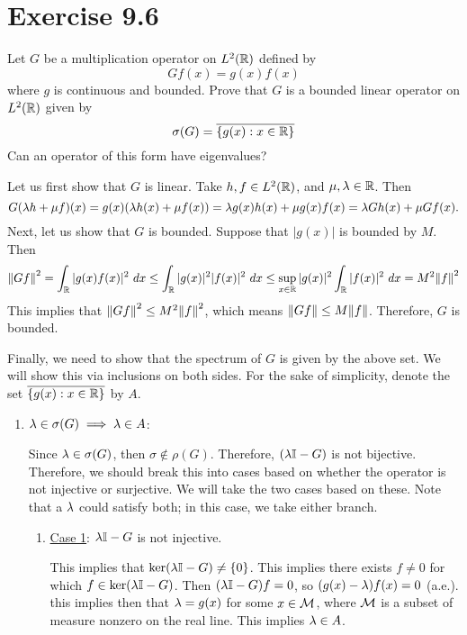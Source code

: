 \section{Exercise 9.6}
Let $G$ be a multiplication operator on $L^2(\mathbb{R})$ defined by 
\[Gf(x) = g(x)f(x)\]
where $g$ is continuous and bounded. Prove that $G$ is a bounded linear operator on $L^2(\mathbb{R})$ given by 
\[\sigma(G) = \overline{\{g(x) : x \in \mathbb{R}\}}\]
Can an operator of this form have eigenvalues?
\partbreak
\begin{solution}

    Let us first show that $G$ is linear. Take $h, f \in L^2(\mathbb{R})$, and $\mu, \mathrm{\lambda} \in \mathbb{R}$. Then
    \[G(\mathrm{\lambda} h + \mu f)(x) = g(x)(\mathrm{\lambda} h(x) + \mu f(x)) = \mathrm{\lambda} g(x) h(x) + \mu g(x) f(x) = \mathrm{\lambda} Gh(x) + \mu Gf(x).\]
    Next, let us show that $G$ is bounded. Suppose that $|g(x)|$ is bounded by $M$. Then 
    \[\norm{Gf}^2 = \int_\R |g(x)f(x)|^2 \ dx \leq \int_\R |g(x)|^2|f(x)|^2 \ dx \leq \sup_{x \in \R}|g(x)|^2\int_\R |f(x)|^2 \ dx = M^2\norm{f}^2\]
    This implies that $\norm{Gf}^2 \leq M^2\norm{f}^2$, which means $\norm{Gf} \leq M\norm{f}$. Therefore, $G$ is bounded. \par

    \jump
    Finally, we need to show that the spectrum of $G$ is given by the above set. We will show this via inclusions on both sides. For the sake of simplicity, denote the set $\overline{\{g(x) : x \in \mathbb{R}\}}$ by $A$.
    \begin{enumerate}
        \item[] \underline{$\mathrm{\lambda} \in \sigma(G) \implies \mathrm{\lambda} \in A$}:

        \hop
        Since $\mathrm{\lambda} \in \sigma(G)$, then $\sigma \not\in \rho(G)$. Therefore, $(\mathrm{\lambda}\mathbb{I} - G)$ is not bijective. Therefore, we should break this into cases based on whether the operator is not injective or surjective. We will take the two cases based on these. Note that a $\mathrm{\lambda}$ could satisfy both; in this case, we take either branch.
        \begin{enumerate}
            \item[] \underline{Case 1}: $\mathrm{\lambda} \mathbb{I} - G$ is not injective.

            \hop
            This implies that $\ker(\mathrm{\lambda}\mathbb{I} - G) \neq \{0\}$. This implies there exists $f \neq 0$ for which $f \in \ker(\mathrm{\lambda}\mathbb{I} - G)$. Then $(\mathrm{\lambda}\mathbb{I} - G)f = 0$, so $(g(x) - \mathrm{\lambda})f(x) = 0$ (a.e.). this implies then that $\mathrm{\lambda} = g(x)$ for some $x \in \mathcal{M}$, where $\mathcal{M}$ is a subset of measure nonzero on the real line. This implies $\mathrm{\lambda} \in A$.  


\end{enumerate}
\end{enumerate}
\end{solution}
